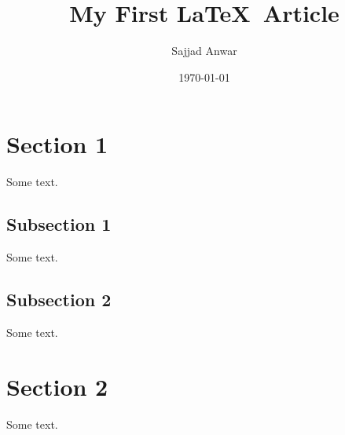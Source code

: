 \documentclass{article}
\title{My First \LaTeX\ Article}
\author{Sajjad Anwar}
\date{\today}
\begin{document}
\maketitle
\newpage
\tableofcontents
\newpage
\section{Section 1}
Some text.
\subsection{Subsection 1}
Some text.
\subsection*{Subsection 2}
Some text.
\section{Section 2}
Some text.
\end{document}
